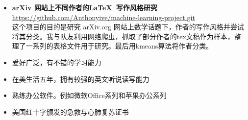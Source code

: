 \documentclass[10pt]{ctexart}
\newcommand{\insertvspace}{%
	\rlap{\color{white}\rule{.4pt}{0.4\baselineskip}}%
	\vspace{\parskip}}%
\begin{document}
	\insertvspace
	\noindent
	\begin{minipage}[t]{0.5\textwidth}
		\begin{itemize}[leftmargin=*]
			\small
			\item[] 
			\textbf{arXiv 网站上不同作者的\LaTeX\ 写作风格研究} \\
			{\color{Cerulean} \href{https://github.com/Anthonyive/machine-learning-project.git}{https://github.com/Anthonyive/machine-learning-project.git}} \\
			这个项目的目的是研究 arXiv.org 网站上数学话题下，作者的写作风格并尝试将其分类。我与队友利用网络爬虫，抓取了部分作者的tex文稿作为样本，整理了一系列的表格文件用于研究。最后用kmeans算法将作者分类。
		\end{itemize}
	\end{minipage}\hspace{0.3in}  %
	\begin{minipage}[t]{0.45\textwidth}
		\begin{itemize}[leftmargin=*]
			\small
			\item 
			爱好广泛，有不错的学习能力
			\item
			在美生活五年，拥有较强的英文听说读写能力
			\item
			熟练办公软件。例如微软Office系列和苹果办公系列
			\item
			美国红十字颁发的急救与心肺复苏证书
		\end{itemize}
	\end{minipage}
	
\end{document}
